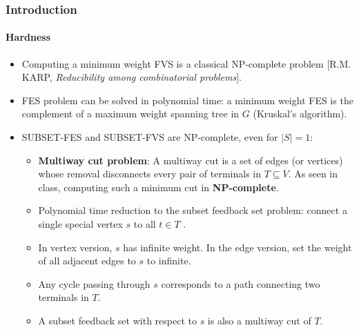 \documentclass[10pt]{beamer}
\begin{document}
\begin{frame}
\frametitle{Introduction}
\framesubtitle{Hardness}
\begin{itemize}
    \item Computing a minimum weight FVS is a classical NP-complete problem [R.M. KARP, \textit{Reducibility among combinatorial problems}].
    \item FES problem can be solved in polynomial time: a minimum weight FES is the complement of a maximum weight
    spanning tree in \(G\) (Kruskal's algorithm).
    \item SUBSET-FES and SUBSET-FVS are NP-complete, even for \(|S| = 1\):
        \begin{itemize}
            \item \textbf{Multiway cut problem}: A multiway cut is a set of edges (or vertices) whose removal disconnects every pair of terminals in \(T \subseteq V\). As seen in class, computing such a minimum cut in \textbf{NP-complete}.
            \item Polynomial time reduction to the subset feedback set problem: connect a single special vertex \(s\) to all \(t \in T\) .
            \item In vertex version, \(s\) has infinite weight. In the edge version, set the weight of all adjacent edges to \(s\) to infinite.
            \item Any cycle passing through \(s\) corresponds to a path connecting two terminals in \(T\).
            \item A subset feedback set with respect to \(s\) is also a multiway cut of \(T\).
        \end{itemize}
\end{itemize}
\end{frame}
\end{document}

